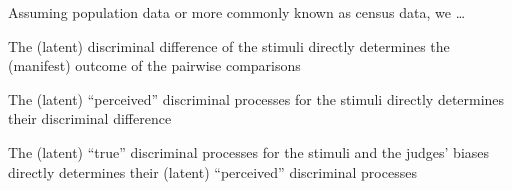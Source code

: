 \documentclass[
  authoryear,
  review,
  1p]{elsarticle}
\begin{document}
Assuming population data or more commonly known as census data, we
\ldots{}

The (latent) discriminal difference of the stimuli directly determines
the (manifest) outcome of the pairwise comparisons

The (latent) ``perceived'' discriminal processes for the stimuli
directly determines their discriminal difference

The (latent) ``true'' discriminal processes for the stimuli and the
judges' biases directly determines their (latent) ``perceived''
discriminal processes

\begin{figure}


\caption{\label{fig-CJ_TM_01}}

\end{figure}%

\begin{figure}


\caption{\label{fig-CJ_TM_02}}

\end{figure}%

\begin{figure}


\caption{\label{fig-CJ_TM_03}}

\end{figure}%
\end{document}
